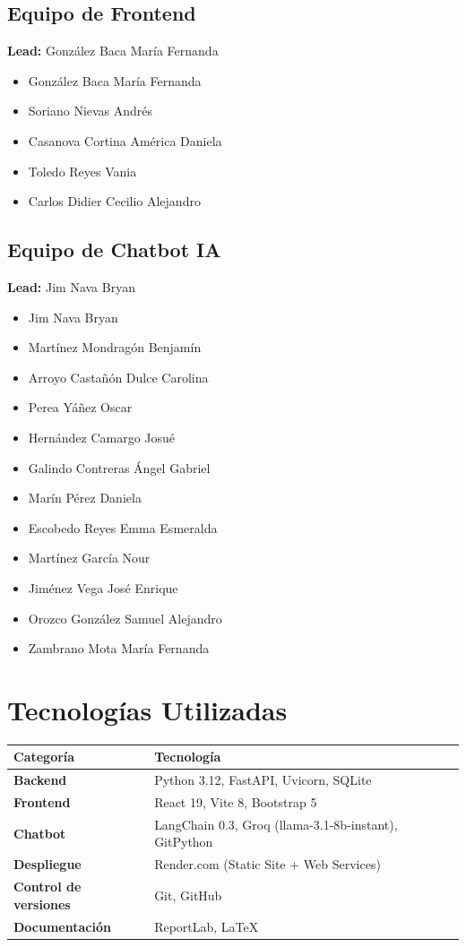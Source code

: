 \documentclass[12pt, letterpaper]{article}
\begin{document}
	\subsection{Equipo de Frontend}
	\textbf{Lead:} González Baca María Fernanda
	\begin{itemize}[noitemsep]
		\item González Baca María Fernanda
		\item Soriano Nievas Andrés
		\item Casanova Cortina América Daniela
		\item Toledo Reyes Vania
		\item Carlos Didier Cecilio Alejandro
	\end{itemize}
	
	\subsection{Equipo de Chatbot IA}
	\textbf{Lead:} Jim Nava Bryan
	\begin{itemize}[noitemsep]
		\item Jim Nava Bryan
		\item Martínez Mondragón Benjamín
		\item Arroyo Castañón Dulce Carolina
		\item Perea Yáñez Oscar
		\item Hernández Camargo Josué
		\item Galindo Contreras Ángel Gabriel
		\item Marín Pérez Daniela
		\item Escobedo Reyes Emma Esmeralda
		\item Martínez García Nour
		\item Jiménez Vega José Enrique
		\item Orozco González Samuel Alejandro
		\item Zambrano Mota María Fernanda
	\end{itemize}
	\newpage
	\section{Tecnologías Utilizadas}
	\begin{table}[h!]
		\centering
		\begin{tabular}{@{}ll@{}}
			\toprule
			\textbf{Categoría} & \textbf{Tecnología} \\
			\midrule
			\textbf{Backend} & Python 3.12, FastAPI, Uvicorn, SQLite \\
			\textbf{Frontend} & React 19, Vite 8, Bootstrap 5 \\
			\textbf{Chatbot} & LangChain 0.3, Groq (llama-3.1-8b-instant), GitPython \\
			\textbf{Despliegue} & Render.com (Static Site + Web Services) \\
			\textbf{Control de versiones} & Git, GitHub \\
			\textbf{Documentación} & ReportLab, LaTeX \\
			\bottomrule
		\end{tabular}
	\end{table}
	
\end{document}
